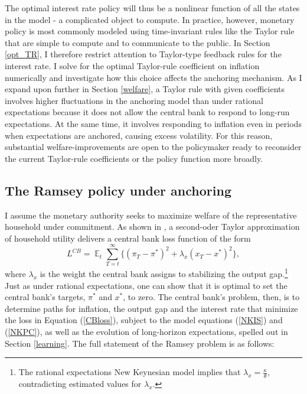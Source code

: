 \documentclass[11pt]{article}
\renewcommand{\[}{\begin{equation}}
\renewcommand{\]}{\end{equation}}
\DeclareMathOperator{\E}{\mathbb{E}}
\begin{document}
The optimal interest rate policy will thus be a nonlinear function of all the states in the model - a complicated object to compute. In practice, however, monetary policy is most commonly modeled using time-invariant rules like the Taylor rule that are simple to compute and to communicate to the public. In Section \ref{opt_TR}, I therefore restrict attention to Taylor-type feedback rules for the interest rate. I solve for the optimal Taylor-rule coefficient on inflation numerically and investigate how this choice affects the anchoring mechanism. As I expand upon further in Section \ref{welfare}, a Taylor rule with given coefficients involves higher fluctuations in the anchoring model than under rational expectations because it does not allow the central bank to respond to long-run expectations. At the same time, it involves responding to inflation even in periods when expectations are anchored, causing excess volatility. For this reason, substantial welfare-improvements are open to the policymaker ready to reconsider the current Taylor-rule coefficients or the policy function more broadly.

\subsection{The Ramsey policy under anchoring}\label{ramsey}
I assume the monetary authority seeks to maximize welfare of the representative household under commitment. As shown in \cite{woodford2011interest}, a second-oder Taylor approximation of household utility delivers a central bank loss function of the form
\begin{equation}
L^{CB} =\E_t \sum_{T=t}^{\infty}\{(\pi_T-\pi^*)^2 +\lambda_x(x_T - x^*)^2 \} \label{CBloss},
\end{equation}
where $\lambda_x$ is the weight the central bank assigns to stabilizing the output gap.\footnote{The rational expectations New Keynesian model implies that $\lambda_x = \frac{\kappa}{\theta}$, contradicting estimated values for $\lambda_x$.} Just as under rational expectations, one can show that it is optimal to set the central bank's targets, $\pi^*$ and $x^*$,  to zero. The central bank's problem, then, is to determine paths for inflation, the output gap and the interest rate that minimize the loss in Equation (\ref{CBloss}), subject to the model equations (\ref{NKIS}) and (\ref{NKPC}), as well as the evolution of long-horizon expectations, spelled out in Section \ref{learning}. The full statement of the Ramsey problem is as follows:
\end{document}
